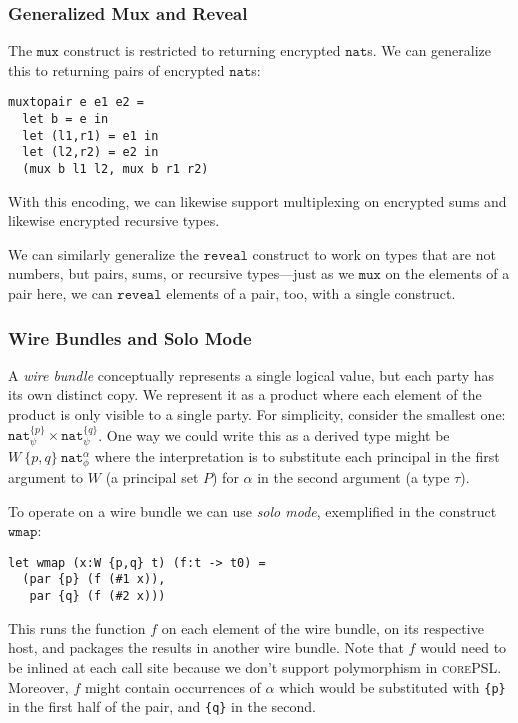\documentclass[10pt]{article}
\newcommand{\kw}[1]{\ensuremath{\mathtt{#1}}}
\newcommand{\tnat}{\ensuremath{\mathtt{nat}}}
\newcommand{\tprod}[2]{\ensuremath{{#1} \times {#2}}}
\newcommand{\lang}{\textsc{corePSL}\xspace}
\begin{document}
\subsubsection{Generalized Mux and Reveal}
\label{sec:generalmux}

 The $\kw{mux}$ construct is restricted to returning encrypted
$\tnat$s. We can generalize this to returning pairs of encrypted
$\tnat$s:
\begin{verbatim}
muxtopair e e1 e2 =
  let b = e in
  let (l1,r1) = e1 in
  let (l2,r2) = e2 in
  (mux b l1 l2, mux b r1 r2)
\end{verbatim}
With this encoding, we can likewise support multiplexing on encrypted
sums and likewise encrypted recursive types.

We can similarly generalize the $\kw{reveal}$ construct to work on types
that are not numbers, but pairs, sums, or recursive types---just as we
\kw{mux} on the elements of a pair here, we can \kw{reveal} elements
of a pair, too, with a single construct.

\subsubsection{Wire Bundles and Solo Mode}

A \emph{wire bundle} conceptually represents a single logical value,
but each party has its own distinct copy. We represent it as a product
where each element of the product is only visible to a single
party. For simplicity, consider the smallest one:
$\tprod{\tnat^{\{p\}}_\psi}{\tnat^{\{q\}}_\psi}$. One way we could
write this as a derived type might be $W~\{p,q\}~\tnat^\alpha_\phi$
where the interpretation is to substitute each principal in the first
argument to $W$ (a principal set $P$) for $\alpha$ in the second
argument (a type $\tau$).

To operate on a wire bundle we can use \emph{solo mode}, exemplified
in the construct $\kw{wmap}$:
\begin{verbatim}
let wmap (x:W {p,q} t) (f:t -> t0) =
  (par {p} (f (#1 x)), 
   par {q} (f (#2 x)))
\end{verbatim}
This runs the function $f$ on each element of the wire bundle, on its
respective host, and packages the results in another wire bundle. Note
that $f$ would need to be inlined at each call site because we don't
support polymorphism in \lang. Moreover, $f$ might contain
occurrences of $\alpha$ which would  be substituted with
\texttt{\{p\}} in the first half of the pair, and \texttt{\{q\}} in
the second.
\end{document}
